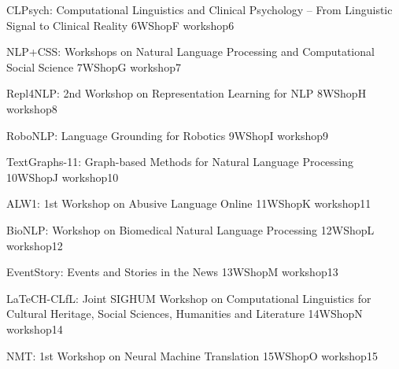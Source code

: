 \begin{wsschedule}
  {CLPsych: Computational Linguistics and Clinical Psychology – From Linguistic Signal to Clinical Reality}
  {6}{WShopF}
  {workshop6}
  {\WShopLocF}
  
\end{wsschedule}

\begin{wsschedule}
  {NLP+CSS: Workshops on Natural Language Processing and Computational Social Science}
  {7}{WShopG}
  {workshop7}
  {\WShopLocG}
  
\end{wsschedule}

\begin{wsschedule}
  {Repl4NLP: 2nd Workshop on Representation Learning for NLP}
  {8}{WShopH}
  {workshop8}
  {\WShopLocH}
  
\end{wsschedule}

\begin{wsschedule}
  {RoboNLP: Language Grounding for Robotics}
  {9}{WShopI}
  {workshop9}
  {\WShopLocI}
  
\end{wsschedule}

\begin{wsschedule}
  {TextGraphs-11: Graph-based Methods for Natural Language Processing}
  {10}{WShopJ}
  {workshop10}
  {\WShopLocJ}
  
\end{wsschedule}


\begin{wsschedule}
  {ALW1: 1st Workshop on Abusive Language Online}
  {11}{WShopK}
  {workshop11}
  {\WShopLocK}
  
\end{wsschedule}

\begin{wsschedule}
  {BioNLP: Workshop on Biomedical Natural Language Processing}
  {12}{WShopL}
  {workshop12}
  {\WShopLocL}
  
\end{wsschedule}

\begin{wsschedule}
  {EventStory: Events and Stories in the News}
  {13}{WShopM}
  {workshop13}
  {\WShopLocM}
  
\end{wsschedule}

\begin{wsschedule}
  {LaTeCH-CLfL: Joint SIGHUM Workshop on Computational Linguistics for Cultural Heritage, Social Sciences, Humanities and Literature}
  {14}{WShopN}
  {workshop14}
  {\WShopLocN}
  
\end{wsschedule}

\begin{wsschedule}
  {NMT: 1st Workshop on Neural Machine Translation}
  {15}{WShopO}
  {workshop15}
  {\WShopLocO}
  
\end{wsschedule}

\clearpage{\thispagestyle{emptyheader}\cleardoublepage}
